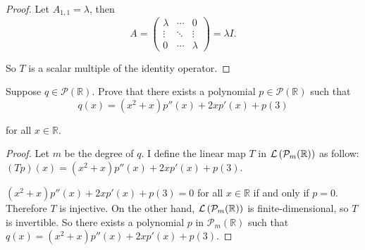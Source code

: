 \begin{proof}
    Let $A_{1,1} = \lambda$, then
    \[
        A = \begin{pmatrix}
            \lambda & \cdots & 0       \\
            \vdots  & \ddots & \vdots  \\
            0       & \cdots & \lambda
        \end{pmatrix} = \lambda I.
    \]

    So $T$ is a scalar multiple of the identity operator.
\end{proof}
\newpage

\begin{exercise}
    Suppose $q\in\mathcal{P}(\mathbb{R})$. Prove that there exists a polynomial $p\in\mathcal{P}(\mathbb{R})$ such that
    \[
        q(x) = (x^{2} + x)p''(x) + 2xp'(x) + p(3)
    \]

    for all $x\in\mathbb{R}$.
\end{exercise}

\begin{proof}
    Let $m$ be the degree of $q$. I define the linear map $T$ in $\mathcal{L}\left({\mathcal{P}_{m}(\mathbb{R})}\right)$ as follow: $(Tp)(x) = (x^{2} + x)p''(x) + 2xp'(x) + p(3)$.

    $(x^{2} + x)p''(x) + 2xp'(x) + p(3) = 0$ for all $x\in\mathbb{R}$ if and only if $p = 0$. Therefore $T$ is injective. On the other hand, $\mathcal{L}\left({\mathcal{P}_{m}(\mathbb{R})}\right)$ is finite-dimensional, so $T$ is invertible. So there exists a polynomial $p$ in $\mathcal{P}_{m}(\mathbb{R})$ such that $q(x) = (x^{2} + x)p''(x) + 2xp'(x) + p(3)$.
\end{proof}
\newpage

